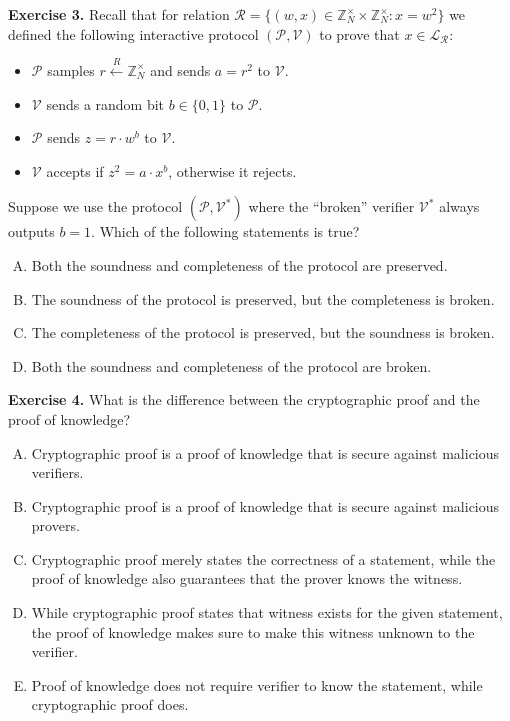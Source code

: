 \documentclass[../lecture-notes-148x210.tex]{subfiles}
\begin{document}
\textbf{Exercise 3.} Recall that for relation $\mathcal{R} = \{(w,x) \in \mathbb{Z}_N^{\times} \times \mathbb{Z}_N^{\times}: x = w^2\}$ we defined the following interactive protocol $(\mathcal{P}, \mathcal{V})$ to prove that $x \in \mathcal{L}_{\mathcal{R}}$:
\begin{itemize}
    \item $\mathcal{P}$ samples $r \xleftarrow{R} \mathbb{Z}_N^{\times}$ and sends $a = r^2$ to $\mathcal{V}$.
    \item $\mathcal{V}$ sends a random bit $b \in \{0,1\}$ to $\mathcal{P}$.
    \item $\mathcal{P}$ sends $z = r \cdot w^b$ to $\mathcal{V}$.
    \item $\mathcal{V}$ accepts if $z^2 = a \cdot x^b$, otherwise it rejects.
\end{itemize}

Suppose we use the protocol $(\mathcal{P}, \mathcal{V}^*)$ where the ``broken'' verifier $\mathcal{V}^*$ always outputs $b=1$. Which of the following statements is true?
\begin{enumerate}[(A)]
    \item Both the soundness and completeness of the protocol are preserved.
    \item The soundness of the protocol is preserved, but the completeness is broken.
    \item The completeness of the protocol is preserved, but the soundness is broken.
    \item Both the soundness and completeness of the protocol are broken.
\end{enumerate}

\textbf{Exercise 4.} What is the difference between the cryptographic proof and the proof of knowledge?
\begin{enumerate}[(A)]
    \item Cryptographic proof is a proof of knowledge that is secure against malicious verifiers.
    \item Cryptographic proof is a proof of knowledge that is secure against malicious provers.
    \item Cryptographic proof merely states the correctness of a statement, while the proof of knowledge also guarantees that the prover knows the witness.
    \item While cryptographic proof states that witness exists for the given statement, the proof of knowledge makes sure to make this witness unknown to the verifier.
    \item Proof of knowledge does not require verifier to know the statement, while cryptographic proof does.
\end{enumerate}
\end{document}
